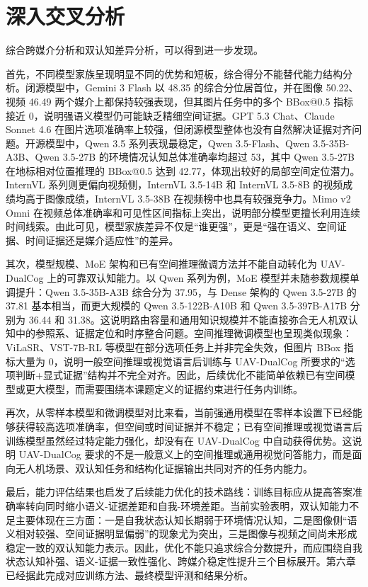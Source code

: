 \FloatBarrier
\section{深入交叉分析}

综合跨媒介分析和双认知差异分析，可以得到进一步发现。

首先，不同模型家族呈现明显不同的优势和短板，综合得分不能替代能力结构分析。闭源模型中，Gemini 3 Flash 以 48.35 的综合分位居首位，并在图像 50.22、视频 46.49 两个媒介上都保持较强表现，但其图片任务中的多个 BBox@0.5 指标接近 0，说明强语义模型仍可能缺乏精细空间证据。GPT 5.3 Chat、Claude Sonnet 4.6 在图片选项准确率上较强，但闭源模型整体也没有自然解决证据对齐问题。开源模型中，Qwen 3.5 系列表现最稳定，Qwen 3.5-Flash、Qwen 3.5-35B-A3B、Qwen 3.5-27B 的环境情况认知总体准确率均超过 53，其中 Qwen 3.5-27B 在地标相对位置推理的 BBox@0.5 达到 42.77，体现出较好的局部空间定位潜力。InternVL 系列则更偏向视频侧，InternVL 3.5-14B 和 InternVL 3.5-8B 的视频成绩均高于图像成绩，InternVL 3.5-38B 在视频榜中也具有较强竞争力。Mimo v2 Omni 在视频总体准确率和可见性区间指标上突出，说明部分模型更擅长利用连续时间线索。由此可见，模型家族差异不仅是“谁更强”，更是“强在语义、空间证据、时间证据还是媒介适应性”的差异。

其次，模型规模、MoE 架构和已有空间推理微调方法并不能自动转化为 UAV-DualCog 上的可靠双认知能力。以 Qwen 系列为例，MoE 模型并未随参数规模单调提升：Qwen 3.5-35B-A3B 综合分为 37.95，与 Dense 架构的 Qwen 3.5-27B 的 37.81 基本相当，而更大规模的 Qwen 3.5-122B-A10B 和 Qwen 3.5-397B-A17B 分别为 36.44 和 31.38。这说明路由容量和通用知识规模并不能直接弥合无人机双认知中的参照系、证据定位和时序整合问题。空间推理微调模型也呈现类似现象：ViLaSR、VST-7B-RL 等模型在部分选项任务上并非完全失效，但图片 BBox 指标大量为 0，说明一般空间推理或视觉语言后训练与 UAV-DualCog 所要求的“选项判断+显式证据”结构并不完全对齐。因此，后续优化不能简单依赖已有空间模型或更大模型，而需要围绕本课题定义的证据约束进行任务内训练。

再次，从零样本模型和微调模型对比来看，当前强通用模型在零样本设置下已经能够获得较高选项准确率，但空间或时间证据并不稳定；已有空间推理或视觉语言后训练模型虽然经过特定能力强化，却没有在 UAV-DualCog 中自动获得优势。这说明 UAV-DualCog 要求的不是一般意义上的空间推理或通用视觉问答能力，而是面向无人机场景、双认知任务和结构化证据输出共同对齐的任务内能力。

最后，能力评估结果也启发了后续能力优化的技术路线：训练目标应从提高答案准确率转向同时缩小语义-证据差距和自我-环境差距。当前实验表明，双认知能力不足主要体现在三方面：一是自我状态认知长期弱于环境情况认知，二是图像侧“语义相对较强、空间证据明显偏弱”的现象尤为突出，三是图像与视频之间尚未形成稳定一致的双认知能力表示。因此，优化不能只追求综合分数提升，而应围绕自我状态认知补强、语义-证据一致性强化、跨媒介稳定性提升三个目标展开。第六章已经据此完成对应训练方法、最终模型评测和结果分析。

